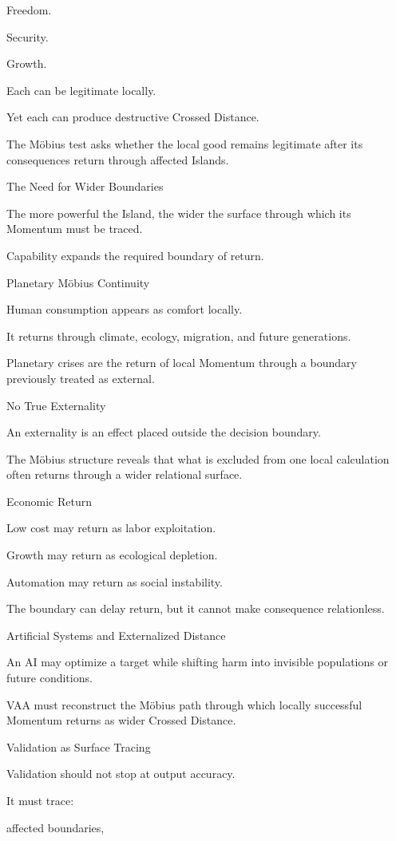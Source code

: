 Freedom.

Security.

Growth.

Each can be legitimate locally.

Yet each can produce destructive Crossed Distance.

The Möbius test asks whether the local good remains legitimate after its consequences return through affected Islands.

The Need for Wider Boundaries

The more powerful the Island, the wider the surface through which its Momentum must be traced.

Capability expands the required boundary of return.

Planetary Möbius Continuity

Human consumption appears as comfort locally.

It returns through climate, ecology, migration, and future generations.

Planetary crises are the return of local Momentum through a boundary previously treated as external.

No True Externality

An externality is an effect placed outside the decision boundary.

The Möbius structure reveals that what is excluded from one local calculation often returns through a wider relational surface.

Economic Return

Low cost may return as labor exploitation.

Growth may return as ecological depletion.

Automation may return as social instability.

The boundary can delay return, but it cannot make consequence relationless.

Artificial Systems and Externalized Distance

An AI may optimize a target while shifting harm into invisible populations or future conditions.

VAA must reconstruct the Möbius path through which locally successful Momentum returns as wider Crossed Distance.

Validation as Surface Tracing

Validation should not stop at output accuracy.

It must trace:

affected boundaries,

